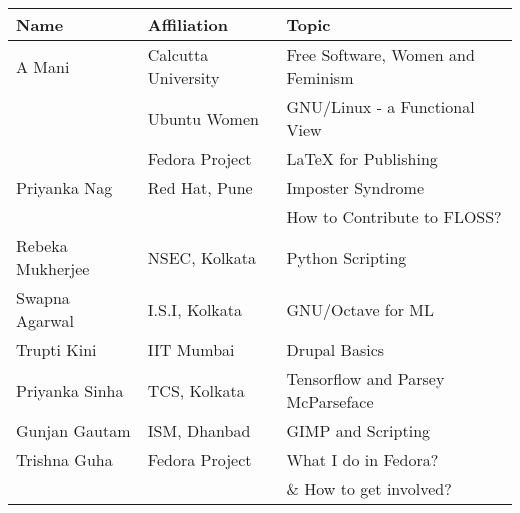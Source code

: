 \documentclass[17pt, a1paper, portrait, margin=0mm, innermargin=15mm, blockverticalspace=9mm, colspace=6mm, subcolspace=3mm]{tikzposter}
\begin{document}
\begin{columns}
{\begin{tabular}{lll}
 \toprule
\textbf{Name} & \textbf{Affiliation} & \textbf{Topic}\\ 
\toprule
A Mani & Calcutta University & Free Software, Women and Feminism\\
      & Ubuntu Women  &  GNU/Linux - a Functional View\\
 & Fedora Project  & LaTeX for Publishing\\
\midrule 
Priyanka Nag & Red Hat, Pune & Imposter Syndrome \\
             &         & How to Contribute to FLOSS? \\
\midrule
Rebeka Mukherjee & NSEC, Kolkata & Python Scripting \\
\midrule
Swapna Agarwal & I.S.I, Kolkata & GNU/Octave for ML\\
\midrule
Trupti Kini &  IIT Mumbai & Drupal Basics \\
\midrule
Priyanka Sinha & TCS, Kolkata & Tensorflow and Parsey McParseface   \\
\midrule
Gunjan Gautam & ISM, Dhanbad & GIMP and Scripting\\
\midrule
Trishna Guha & Fedora Project & What I do in Fedora?\\
             &      & \& How to get involved?\\
\bottomrule
\end{tabular}}

\end{columns}
\end{document}
